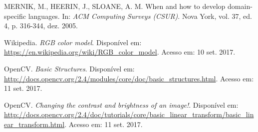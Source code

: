 \documentclass[a4paper, 10pt, conference]{ieeeconf}
\begin{document}
\begin{thebibliography}{99}

 MERNIK, M., HEERIN, J., SLOANE, A. M. When and how to develop domain-specific languages. In: \textit{ACM Computing Surveys (CSUR)}. Nova York, vol. 37, ed. 4, p. 316-344, dez. 2005.

 Wikipedia. \textit{RGB color model}. Disponível em: \url{https://en.wikipedia.org/wiki/RGB_color_model}. Acesso em: 10 set. 2017.

 OpenCV. \textit{Basic Structures}. Disponível em: \url{http://docs.opencv.org/2.4/modules/core/doc/basic_structures.html}. Acesso em: 11 set. 2017.

 OpenCV. \textit{Changing the contrast and brightness of an image!}. Disponível em: \url{http://docs.opencv.org/2.4/doc/tutorials/core/basic_linear_transform/basic_linear_transform.html}. Acesso em: 11 set. 2017.

\end{thebibliography}
\end{document}
